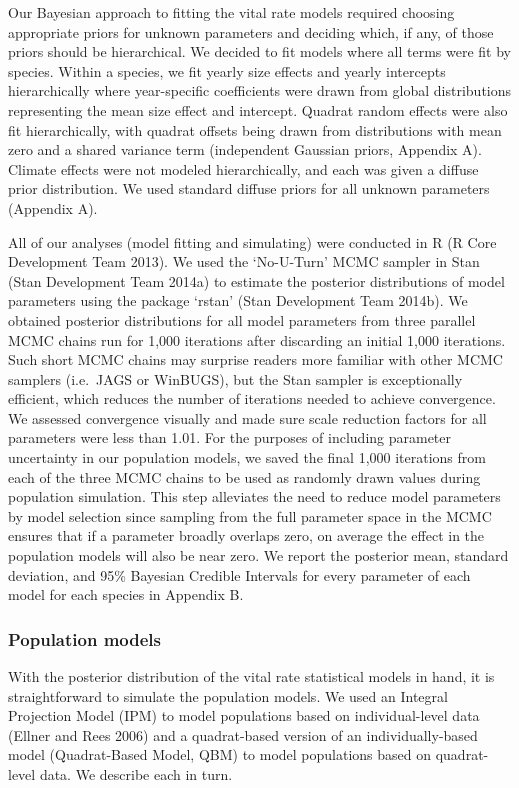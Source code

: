 \documentclass[12pt,]{article}
\begin{document}
Our Bayesian approach to fitting the vital rate models required choosing
appropriate priors for unknown parameters and deciding which, if any, of
those priors should be hierarchical. We decided to fit models where all
terms were fit by species. Within a species, we fit yearly size effects
and yearly intercepts hierarchically where year-specific coefficients
were drawn from global distributions representing the mean size effect
and intercept. Quadrat random effects were also fit hierarchically, with
quadrat offsets being drawn from distributions with mean zero and a
shared variance term (independent Gaussian priors, Appendix A). Climate
effects were not modeled hierarchically, and each was given a diffuse
prior distribution. We used standard diffuse priors for all unknown
parameters (Appendix A).

All of our analyses (model fitting and simulating) were conducted in R
(R Core Development Team 2013). We used the `No-U-Turn' MCMC sampler in
Stan (Stan Development Team 2014a) to estimate the posterior
distributions of model parameters using the package `rstan' (Stan
Development Team 2014b). We obtained posterior distributions for all
model parameters from three parallel MCMC chains run for 1,000
iterations after discarding an initial 1,000 iterations. Such short MCMC
chains may surprise readers more familiar with other MCMC samplers
(i.e.~JAGS or WinBUGS), but the Stan sampler is exceptionally efficient,
which reduces the number of iterations needed to achieve convergence. We
assessed convergence visually and made sure scale reduction factors for
all parameters were less than 1.01. For the purposes of including
parameter uncertainty in our population models, we saved the final 1,000
iterations from each of the three MCMC chains to be used as randomly
drawn values during population simulation. This step alleviates the need
to reduce model parameters by model selection since sampling from the
full parameter space in the MCMC ensures that if a parameter broadly
overlaps zero, on average the effect in the population models will also
be near zero. We report the posterior mean, standard deviation, and 95\%
Bayesian Credible Intervals for every parameter of each model for each
species in Appendix B.

\subsubsection{Population models}\label{population-models}

With the posterior distribution of the vital rate statistical models in
hand, it is straightforward to simulate the population models. We used
an Integral Projection Model (IPM) to model populations based on
individual-level data (Ellner and Rees 2006) and a quadrat-based version
of an individually-based model (Quadrat-Based Model, QBM) to model
populations based on quadrat-level data. We describe each in turn.
\end{document}
